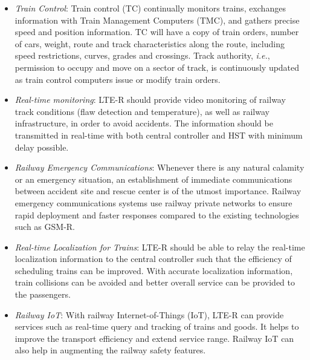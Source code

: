 \begin{itemize}
\item \textit{Train Control}: Train control (TC) continually monitors trains, exchanges information with Train Management Computers (TMC), and gathers precise speed and position information. TC will have a copy of train orders, number of cars, weight, route and track characteristics along the route, including speed restrictions, curves, grades and crossings. Track authority, \textit{i.e.}, permission to occupy and move on a sector of track, is continuously updated as train control computers issue or modify train orders.

\item \textit{Real-time monitoring}: LTE-R should provide video monitoring of railway track conditions (flaw detection and temperature), as well as railway infrastructure, in order to avoid accidents. The information should be transmitted in real-time with both central controller and HST with minimum delay possible. 

\item \textit{Railway Emergency Communications}: Whenever there is any natural calamity or an emergency situation, an establishment of immediate communications between accident site and rescue center is of the utmost importance. Railway emergency communications systems use railway private networks to ensure rapid deployment and faster responses compared to the existing technologies such as GSM-R. 

\item \textit{Real-time Localization for Trains}: LTE-R should be able to relay the real-time localization information to the central controller such that the efficiency of scheduling trains can be improved. With accurate localization information, train collisions can be avoided and better overall service can be provided to the passengers.

\item \textit{Railway IoT}: With railway Internet-of-Things (IoT), LTE-R can provide services such as real-time query and tracking of trains and goods. It helps to improve the transport efficiency and extend service range. Railway IoT can also help in augmenting the railway safety features.
\end{itemize}

